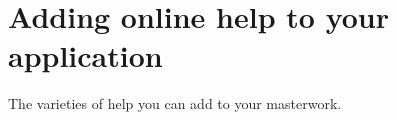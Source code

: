 \chapter{Adding online help to your application}\label{chaphelp}
%
%
\setfooter{\thepage}{}{}{}{}{\thepage}%

The varieties of help you can add to your masterwork.

